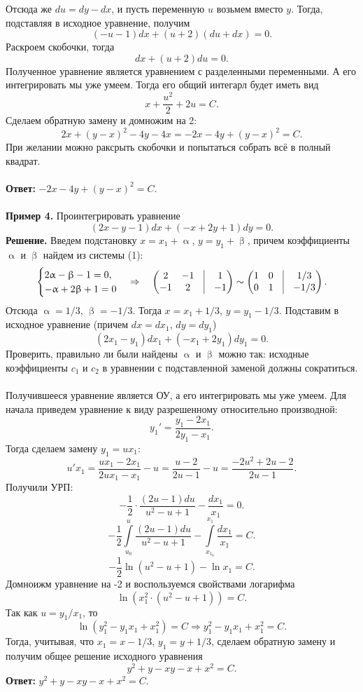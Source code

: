 \documentclass[a4paper, 12pt]{article}
\renewcommand{\alpha}{\upalpha}
\renewcommand{\alpha}{\upalpha}
\renewcommand{\beta}{\upbeta}
\begin{document}
Отсюда же $du = dy - dx$, и пусть переменную $u$ возьмем вместо $y$. Тогда, подставляя в исходное уравнение, получим $$(-u-1)dx + (u+2)(du + dx) = 0.$$
Раскроем скобочки, тогда $$dx + (u+2)du = 0.$$
Полученное уравнение является уравнением с разделенными переменными. А его интегрировать мы уже умеем. Тогда его общий интегарл будет иметь вид $$x + \dfrac{u^2}{2} + 2u = C.$$
Сделаем обратную замену и домножим на 2:
$$2x + (y - x)^2 - 4y - 4x  = -2x - 4y + (y-x)^2 = C.$$
При желании можно раксрыть скобочки и попытаться собрать всё в полный квадрат.\\\\
\textbf{Ответ:} $-2x - 4y + (y-x)^2 = C.$\\\\
\textbf{Пример 4.} Проинтегрировать уравнение $$(2x - y -1)dx + (-x + 2y +1)dy = 0.$$
\textbf{Решение.} Введем подстановку $x = x_1 + \alpha$, $y = y_1 + \beta$, причем коэффициенты $\alpha$ и $\beta$ найдем из системы (1):
$$\begin{cases}
	2\alpha - \beta - 1 = 0,\\
	-\alpha + 2\beta +1 = 0
\end{cases}\Rightarrow\quad \begin{pmatrix}
2 & -1 & \vline & 1\\
-1 & 2 & \vline & -1
\end{pmatrix}\sim \begin{pmatrix}
1 & 0 & \vline & 1/3\\
0 & 1 & \vline & -1/3
\end{pmatrix}.$$
Отсюда $\alpha = 1/3$, $\beta = -1/3$. Тогда $x = x_1 + 1/3$, $y = y_1 -1/3$. Подставим в исходное уравнение (причем $dx = dx_1$, $dy = dy_1$)
$$(2x_1 -y_1)dx_1 + (-x_1 + 2y_1)dy_1 = 0.$$
Проверить, правильно ли были найдены $\alpha$ и $\beta$ можно так: исходные коэффициенты $c_1$ и $c_2$ в уравнении с подставленной заменой должны сократиться.\\\\
Получившееся уравнение является ОУ, а его интегрировать мы уже умеем. Для начала приведем уравнение к виду разрешенному относительно производной:
$$y_1' = \dfrac{y_1 - 2x_1}{2y_1 - x_1}.$$
Тогда сделаем замену $y_1 = ux_1$:
$$u'x_1 = \dfrac{ux_1 - 2x_1}{2ux_1 - x_1} - u = \dfrac{u - 2}{2u  -1} - u = \dfrac{-2u^2 + 2u - 2}{2u - 1}.$$
Получили УРП:
$$-\dfrac{1}{2}\cdot\dfrac{(2u-1)du}{u^2 - u +1} - \dfrac{dx_1}{x_1} = 0.$$
$$-\dfrac{1}{2}\int\limits_{u_0}^u\dfrac{(2u-1)du}{u^2 - u +1} - \int\limits_{x_{1_0}}^{x_1}\dfrac{dx_1}{x_1} = C.$$
$$-\dfrac{1}{2}\ln(u^2 - u + 1) - \ln x_1 = C.$$
Домноижм уравнение на -2 и воспользуемся свойствами логарифма$$\ln (x_1^2\cdot (u^2 - u + 1)) = C.$$
Так как $u = y_1/x_1$, то $$\ln(y_1^2 - y_1x_1 + x_1^2) = C \Rightarrow y_1^2 - y_1x_1 + x_1^2 = C.$$
Тогда, учитывая, что $x_1 = x-1/3$, $y_1 = y + 1/3$, сделаем обратную замену и получим общее решение исходного уравнения $$y^2 + y - xy - x + x^2 = C.$$
\textbf{Ответ:} $y^2 + y - xy - x + x^2 = C.$
\end{document}
